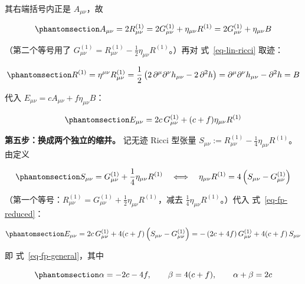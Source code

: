 \documentclass[
  chinese,
  a4paper,
  UTF8,
  12pt,
  oneside,
  openany]{ctexbook}
\theoremstyle{plain}
\theoremstyle{plain}
\theoremstyle{plain}
\theoremstyle{definition}
\theoremstyle{plain}
\theoremstyle{plain}
\theoremstyle{remark}
\begin{document}
其右端括号内正是 \(A_{\mu\nu}\)，故

\begin{equation}\protect\phantomsection\label{eq-A-in-G}{
A_{\mu\nu}=2R^{(1)}_{\mu\nu}
=2G^{(1)}_{\mu\nu}+\eta_{\mu\nu}R^{(1)}=2G^{(1)}_{\mu\nu}+\eta_{\mu\nu}B
}\end{equation}

（第二个等号用了
\(G^{(1)}_{\mu\nu}=R^{(1)}_{\mu\nu}-\frac{1}{2}\eta_{\mu\nu}R^{(1)}\)。）再对
式~\ref{eq-lin-ricci} 取迹：

\begin{equation}\protect\phantomsection\label{eq-B-equals-R}{
R^{(1)}=\eta^{\mu\nu}R^{(1)}_{\mu\nu}
=\frac{1}{2}\left(2\,\partial^{\mu}\partial^{\nu}h_{\mu\nu}-2\,\partial^{2}h\right)
=\partial^{\mu}\partial^{\nu}h_{\mu\nu}-\partial^{2}h=B
}\end{equation}

代入 \(E_{\mu\nu}=cA_{\mu\nu}+f\eta_{\mu\nu}B\)：

\begin{equation}\protect\phantomsection\label{eq-fp-reduced}{
E_{\mu\nu} = 2c\,G^{(1)}_{\mu\nu}+(c+f)\eta_{\mu\nu}R^{(1)}
}\end{equation}

\textbf{第五步：换成两个独立的缩并。} 记无迹 Ricci 型张量
\(S_{\mu\nu}:=R^{(1)}_{\mu\nu}-\frac{1}{4}\eta_{\mu\nu}R^{(1)}\)。由定义

\begin{equation}\protect\phantomsection\label{eq-R-from-SG}{
S_{\mu\nu}=G^{(1)}_{\mu\nu}+\frac{1}{4}\eta_{\mu\nu}R^{(1)}
\quad\Longleftrightarrow\quad
\eta_{\mu\nu}R^{(1)}=4\left(S_{\mu\nu}-G^{(1)}_{\mu\nu}\right)
}\end{equation}

（第一个等号：\(R^{(1)}_{\mu\nu}=G^{(1)}_{\mu\nu}+\frac{1}{2}\eta_{\mu\nu}R^{(1)}\)，减去
\(\frac{1}{4}\eta_{\mu\nu}R^{(1)}\)。）代入 式~\ref{eq-fp-reduced}：

\begin{equation}\protect\phantomsection\label{eq-fp-final}{
E_{\mu\nu}
= 2c\,G^{(1)}_{\mu\nu}+4(c+f)\left(S_{\mu\nu}-G^{(1)}_{\mu\nu}\right)
= -\left(2c+4f\right)G^{(1)}_{\mu\nu}+4(c+f)\,S_{\mu\nu}
}\end{equation}

即 式~\ref{eq-fp-general}，其中

\begin{equation}\protect\phantomsection\label{eq-alpha-beta}{
\alpha=-2c-4f,
\qquad
\beta=4(c+f),
\qquad
\alpha+\beta=2c
}\end{equation}
\end{document}
